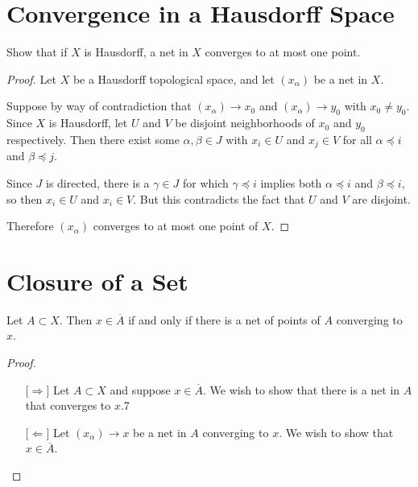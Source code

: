 \documentclass[12pt]{article}
\begin{document}
\section{Convergence in a Hausdorff Space}
Show that if $X$ is Hausdorff, a net in $X$ converges to at most one point.
\begin{proof}
    Let $X$ be a Hausdorff topological space, and let $(x_\alpha)$ be a net in $X$.

    Suppose by way of contradiction that $(x_\alpha) \to x_0$ and $(x_\alpha) \to y_0$ with
    $x_0 \neq y_0$. Since $X$ is Hausdorff, let $U$ and $V$ be disjoint neighborhoods of
    $x_0$ and $y_0$ respectively. Then there exist some $\alpha, \beta \in J$ with
    $x_i \in U$ and $x_j \in V$ for all $\alpha \preceq i$ and $\beta \preceq j$.

    Since $J$ is directed, there is a $\gamma \in J$ for which $\gamma \preceq i$ implies both
    $\alpha \preceq i$ and $\beta \preceq i$, so then $x_i \in U$ and $x_i \in V$. But this
    contradicts the fact that $U$ and $V$ are disjoint.

    Therefore $(x_\alpha)$ converges to at most one point of $X$.
\end{proof}

\section{Closure of a Set}
\begin{thm}
    Let $A \subset X$. Then $x \in \overline A$ if and only if there is a net of points of $A$
    converging to $x$.
\end{thm}
\begin{proof}
    \ \vspace{-0.5cm}\newline
    \begin{itemize}
        \item[$\lbrack\Rightarrow\rbrack$] Let $A \subset X$ and suppose $x \in \overline A$. We wish to show that there is a net in $A$ that converges to $x$.7
        \item[$\lbrack\Leftarrow\rbrack$] Let $(x_\alpha) \to x$ be a net in $A$ converging to $x$. We wish to show that $x \in \overline A$.
    \end{itemize}

\end{proof}
\end{document}
